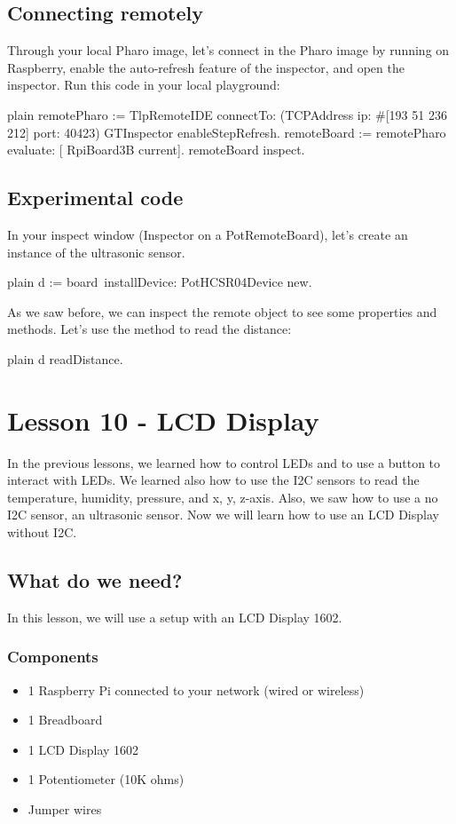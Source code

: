 \documentclass[10pt,twoside,english]{_support/latex/sbabook/sbabook}
\begin{document}
\section{Connecting remotely}
Through your local Pharo image, let’s connect in the Pharo image by running on Raspberry, enable the auto-refresh feature of the inspector, and open the inspector.
Run this code in your local playground:

\begin{displaycode}{plain}
remotePharo := TlpRemoteIDE connectTo: (TCPAddress ip: #[193 51 236 212] port: 40423)
GTInspector enableStepRefresh.
remoteBoard := remotePharo evaluate: [ RpiBoard3B current].
remoteBoard inspect.
\end{displaycode}
\section{Experimental code}
In your inspect window (Inspector on a PotRemoteBoard), let’s create an instance of the ultrasonic sensor. 

\begin{displaycode}{plain}
d := board installDevice: PotHCSR04Device new. ​ 
\end{displaycode}

As we saw before, we can inspect the remote object to see some properties and methods. Let's use the method  to read the distance: 

\begin{displaycode}{plain}
d readDistance.  
\end{displaycode}
\chapter{Lesson 10 - LCD Display}
In the previous lessons, we learned how to control LEDs and to use a button to interact with LEDs. We learned also how to use the I2C sensors to read the temperature, humidity, pressure, and x, y, z-axis. Also, we saw how to use a no I2C sensor, an ultrasonic sensor. Now we will learn how to use an LCD Display without I2C. 
\section{What do we need?}
In this lesson, we will use a setup with an LCD Display 1602.
\subsection{Components}
\begin{itemize}
\item 1 Raspberry Pi connected to your network (wired or wireless)
\item 1 Breadboard
\item 1 LCD Display 1602 
\item 1 Potentiometer (10K ohms)
\item Jumper wires
\end{itemize}
\end{document}
